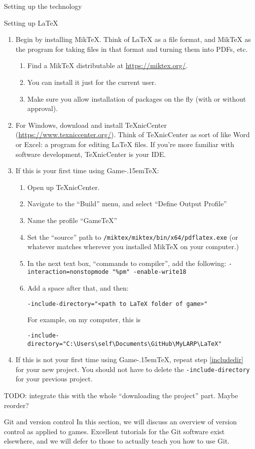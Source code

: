 \documentclass[11pt,  total={6in, 8in}]{article}
\def\gametex{\mbox{Game\kern-.15em\TeX}}
\begin{document}
\begin{section}{Setting up the technology}
\begin{subsection}{Setting up \LaTeX{}}
\begin{enumerate}
\item Begin by installing MikTeX.  Think of \LaTeX{} as a file format, and MikTeX as the program for taking files in that format and turning them into PDFs, etc.
\begin{enumerate}
\item Find a MikTeX distributable at \url{https://miktex.org/}.
\item You can install it just for the current user.
\item Make sure you allow installation of packages on the fly (with or without approval).
\end{enumerate}
\item For Windows, download and install TeXnicCenter (\url{https://www.texniccenter.org/}).  Think of TeXnicCenter as sort of like Word or Excel: a program for editing \LaTeX{} files.  If you're more familiar with software development, TeXnicCenter is your IDE.
\item If this is your first time using \gametex{}:
\begin{enumerate}
\item Open up TeXnicCenter.
\item Navigate to the “Build” menu, and select “Define Output Profile”
\item Name the profile “GameTeX”
\item Set the “source” path to \texttt{/miktex/miktex/bin/x64/pdflatex.exe} (or whatever matches wherever you installed MikTeX on your computer.)   
\item In the next text box, “commands to compiler”, add the following: \lstinline|-interaction=nonstopmode "%pm" -enable-write18|
\item \label{includedir} Add a space after that, and then: 
\begin{verbatim}
-include-directory="<path to LaTeX folder of game>"
\end{verbatim}
For example, on my computer, this is
\begin{verbatim}
-include-directory="C:\Users\self\Documents\GitHub\MyLARP\LaTeX"
\end{verbatim}
\end{enumerate}
\item If this is not your first time using \gametex{}, repeat step \ref{includedir} for your new project.  You should not have to delete the \lstinline|-include-directory| for your previous project.
\end{enumerate}
TODO: integrate this with the whole ``downloading the project'' part.  Maybe reorder?
\end{subsection}
\begin{subsection}{Git and version control}
In this section, we will discuss an overview of version control as applied to games.  Excellent tutorials for the Git software exist elsewhere, and we will defer to those to actually teach you how to use Git.


\end{subsection}
\end{section}
\end{document}
